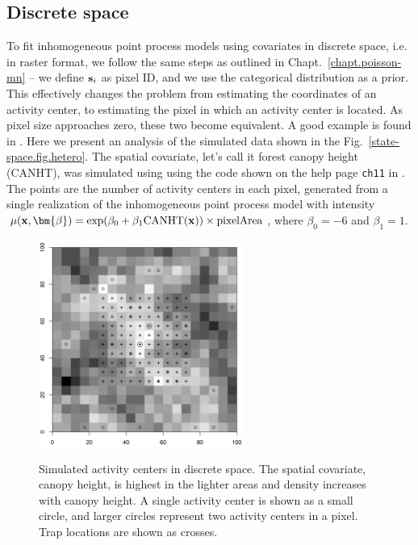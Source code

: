 \subsection{Discrete space}
\label{modeling.sec.discrete}

To fit inhomogeneous point process models using covariates in discrete
space, i.e. in raster format, we follow the same steps
as outlined in Chapt.~\ref{chapt.poisson-mn} -- we define ${\bf s}_i$ as
pixel ID, and we use the categorical distribution as a prior. This
effectively changes the problem from estimating the coordinates of an
activity center, to estimating the pixel in which an activity center is
located. As pixel size approaches zero, these two become equivalent. A good
example is found in \citep{mollet_etal:2012}. Here we present
an analysis of the simulated data shown in the %
Fig.~\ref{state-space.fig.hetero}. The spatial covariate, let's call it
forest canopy height (CANHT), was simulated
using using the code shown on the help page
\verb+ch11+ in \scrbook. The points are the number of
activity centers in each pixel, generated from a single realization of
the inhomogeneous point process model with intensity
$\mu(\mathbf{x}, \bm{\beta}) = \exp(\beta_0 + \beta_1
\text{CANHT}({\bf x}))\times\text{pixelArea}$,
where $\beta_0 = -6$ and $\beta_1 = 1$.
\begin{figure}%
\centering
\includegraphics[width=0.6\textwidth]{Ch11-Statespace/figs/discrete}
\label{state-space.fig.discrete}
\caption{Simulated activity centers in discrete space. The spatial
  covariate, canopy height, is highest in the lighter areas and
  density increases with canopy height. A single
  activity center is shown as a small circle, and larger circles
  represent two activity centers in a pixel. Trap locations
  are shown as crosses.}
\end{figure}


